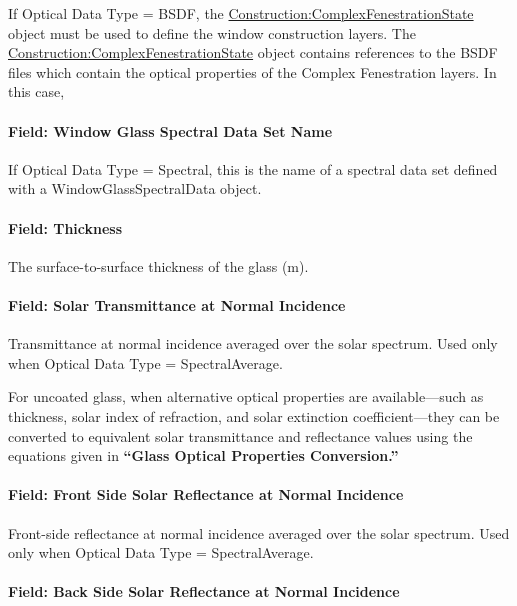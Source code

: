 If Optical Data Type = BSDF, the \hyperref[constructioncomplexfenestrationstate]{Construction:ComplexFenestrationState} object must be used to define the window construction layers. The \hyperref[constructioncomplexfenestrationstate]{Construction:ComplexFenestrationState} object contains references to the BSDF files which contain the optical properties of the Complex Fenestration layers. In this case,

\paragraph{Field: Window Glass Spectral Data Set Name}\label{field-window-glass-spectral-data-set-name}

If Optical Data Type = Spectral, this is the name of a spectral data set defined with a WindowGlassSpectralData object.

\paragraph{Field: Thickness}\label{field-thickness-1}

The surface-to-surface thickness of the glass (m).

\paragraph{Field: Solar Transmittance at Normal Incidence}\label{field-solar-transmittance-at-normal-incidence}

Transmittance at normal incidence averaged over the solar spectrum. Used only when Optical Data Type = SpectralAverage.

For uncoated glass, when alternative optical properties are available---such as thickness, solar index of refraction, and solar extinction coefficient---they can be converted to equivalent solar transmittance and reflectance values using the equations given in \textbf{``Glass Optical Properties Conversion.''}

\paragraph{Field: Front Side Solar Reflectance at Normal Incidence}\label{field-front-side-solar-reflectance-at-normal-incidence}

Front-side reflectance at normal incidence averaged over the solar spectrum. Used only when Optical Data Type = SpectralAverage.

\paragraph{Field: Back Side Solar Reflectance at Normal Incidence}\label{field-back-side-solar-reflectance-at-normal-incidence}

